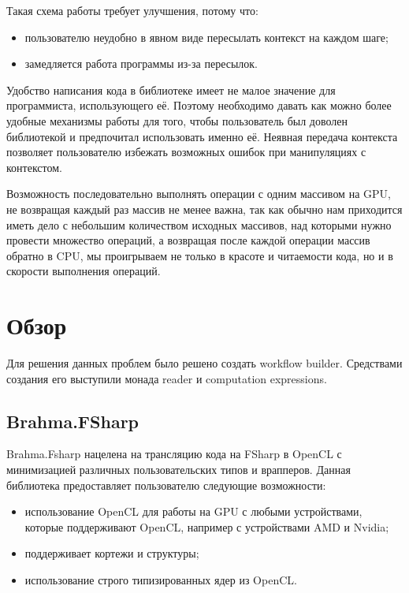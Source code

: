 \documentclass[14pt]{matmex-diploma}
\begin{document}
Такая схема работы требует улучшения, потому что:
\begin{itemize}
\item пользователю неудобно в явном виде пересылать контекст на каждом шаге;
\item замедляется работа программы из-за пересылок.
\end{itemize}

Удобство написания кода в библиотеке имеет не малое значение для программиста, использующего её. Поэтому необходимо давать как можно более удобные механизмы работы для того, чтобы пользователь был доволен библиотекой и предпочитал использовать именно её. Неявная передача контекста позволяет пользователю избежать возможных ошибок при манипуляциях с контекстом.

Возможность последовательно выполнять операции с одним массивом на GPU, не возвращая каждый раз массив не менее важна, так как обычно нам приходится иметь дело с небольшим количеством исходных массивов, над которыми нужно провести множество операций, а возвращая после каждой операции массив обратно в CPU, мы проигрываем не только в красоте и читаемости кода, но и в скорости выполнения операций.


\section{Обзор}
Для решения данных проблем было решено создать workflow builder. Средствами создания его выступили монада reader и computation expressions.
\subsection {Brahma.FSharp}
Brahma.Fsharp нацелена на трансляцию кода на FSharp в OpenCL с минимизацией различных пользовательских типов и врапперов.
Данная библиотека предоставляет пользователю следующие возможности:
\begin{itemize}
\item использование OpenCL для работы на GPU с любыми устройствами, которые поддерживают OpenCL, например с устройствами AMD и Nvidia;
\item поддерживает кортежи и структуры;
\item использование строго типизированных ядер из OpenCL.
\end{itemize}
\end{document}
